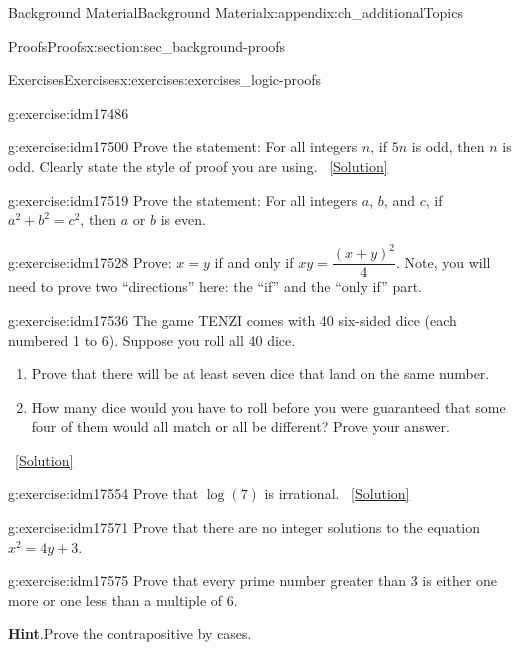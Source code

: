 \documentclass[oneside,10pt,]{book}
\numberwithin{equation}{chapter}
\begin{document}
\begin{appendixptx}{Background Material}{}{Background Material}{}{}{x:appendix:ch_additionalTopics}
\begin{sectionptx}{Proofs}{}{Proofs}{}{}{x:section:sec_background-proofs}
\begin{exercises-subsection}{Exercises}{}{Exercises}{}{}{x:exercises:exercises_logic-proofs}
\begin{divisionexercise}{7}{}{}{g:exercise:idm17486}
%
\end{divisionexercise}%
\begin{divisionexercise}{8}{}{}{g:exercise:idm17500}%
Prove the statement: For all integers \(n\), if \(5n\) is odd, then \(n\) is odd. Clearly state the style of proof you are using.%
\qquad~\hfill{\tiny\hyperlink{g:solution:idm17506-main}{[Solution]}}\end{divisionexercise}%
\begin{divisionexercise}{9}{}{}{g:exercise:idm17519}%
Prove the statement: For all integers \(a\), \(b\), and \(c\), if \(a^2 + b^2 = c^2\), then \(a\) or \(b\) is even.%
\end{divisionexercise}%
\begin{divisionexercise}{10}{}{}{g:exercise:idm17528}%
Prove: \(x=y\) if and only if \(xy=\dfrac{(x+y)^2}{4}\). Note, you will need to prove two ``directions'' here: the ``if'' and the ``only if'' part.%
\end{divisionexercise}%
\begin{divisionexercise}{11}{}{}{g:exercise:idm17536}%
The game TENZI comes with 40 six-sided dice (each numbered 1 to 6). Suppose you roll all 40 dice.%
\begin{enumerate}[label=(\alph*)]
\item{}Prove that there will be at least seven dice that land on the same number.%
\item{}How many dice would you have to roll before you were guaranteed that some four of them would all match or all be different? Prove your answer.%
\end{enumerate}
%
\qquad~\hfill{\tiny\hyperlink{g:solution:idm17543-main}{[Solution]}}\end{divisionexercise}%
\begin{divisionexercise}{12}{}{}{g:exercise:idm17554}%
Prove that \(\log(7)\) is irrational.%
\qquad~\hfill{\tiny\hyperlink{g:solution:idm17558-main}{[Solution]}}\end{divisionexercise}%
\begin{divisionexercise}{13}{}{}{g:exercise:idm17571}%
Prove that there are no integer solutions to the equation \(x^2 = 4y + 3\).%
\end{divisionexercise}%
\begin{divisionexercise}{14}{}{}{g:exercise:idm17575}%
Prove that every prime number greater than 3 is either one more or one less than a multiple of 6.%
\par\smallskip%
\noindent\textbf{Hint}.\hypertarget{g:hint:idm17578}{}\quad{}Prove the contrapositive by cases.%

\end{divisionexercise}
\end{exercises-subsection}
\end{sectionptx}
\end{appendixptx}
\end{document}
